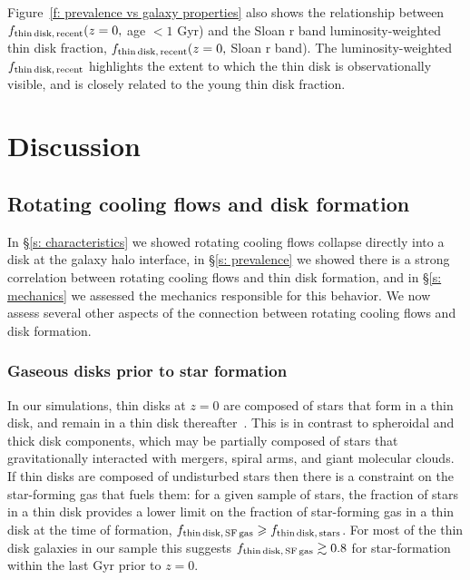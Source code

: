 \documentclass[fleqn,usenatbib]{mnras}
\begin{document}
Figure~\ref{f: prevalence vs galaxy properties} also shows the relationship between $f_{\rm thin\,disk,\,recent}(z=0,$ age $<1$ Gyr) and the Sloan r band luminosity-weighted thin disk fraction, $f_{\rm thin\,disk,\,recent}(z=0,$ Sloan r band).
The luminosity-weighted $f_{\rm thin\,disk,\,recent}$ highlights the extent to which the thin disk is observationally visible, and is closely related to the young thin disk fraction.


\section{Discussion}

\label{s: discussion}

\subsection{Rotating cooling flows and disk formation}
\label{s: disk formation}

In \S\ref{s: characteristics} we showed rotating cooling flows collapse directly into a disk at the galaxy halo interface, in \S\ref{s: prevalence} we showed there is a strong correlation between rotating cooling flows and thin disk formation, and in \S\ref{s: mechanics} we assessed the mechanics responsible for this behavior.
We now assess several other aspects of the connection between rotating cooling flows and disk formation.

\subsubsection{Gaseous disks prior to star formation}
\label{s: disk formation -- condition}

In our simulations, thin disks at $z=0$ are composed of stars that form in a thin disk, and remain in a thin disk thereafter~\citep{Yu2021}.
This is in contrast to spheroidal and thick disk components, which may be partially composed of stars that gravitationally interacted with mergers, spiral arms, and giant molecular clouds.
If thin disks are composed of undisturbed stars then there is a  constraint on the star-forming gas that fuels them:
for a given sample of stars, the fraction of stars in a thin disk provides a lower limit on the fraction of star-forming gas in a thin disk at the time of formation, $f_{\rm thin\,disk,\,SF\,gas} \ge f_{\rm thin\,disk,\,stars}$.
For most of the thin disk galaxies in our sample this suggests $f_{\rm thin\,disk,\,SF\,gas} \gtrsim 0.8$ for star-formation within the last Gyr prior to $z=0$.
\end{document}
